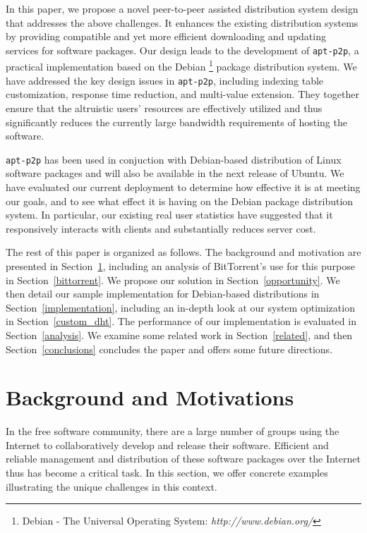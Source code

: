 \documentclass[conference]{IEEEtran}
\begin{document}
In this paper, we propose a novel peer-to-peer assisted distribution system design that
addresses the above challenges. It enhances the existing distribution systems by providing compatible and yet more efficient downloading and updating services
for software packages. Our design leads to the development of \texttt{apt-p2p}, a practical implementation based on the Debian \footnote{Debian - The Universal Operating System: {\it http://www.debian.org/}} package
distribution system.  We have addressed the key design issues in \texttt{apt-p2p}, including indexing table customization,
response time reduction, and multi-value extension. They together ensure
that the altruistic users' resources are effectively utilized and thus significantly reduces the currently
large bandwidth requirements of hosting the software.

\texttt{apt-p2p}  has been used in conjuction with Debian-based distribution of Linux
software packages and will also be available in the next release of Ubuntu. We have evaluated our current deployment  to
determine how effective it is at meeting our goals, and to see what
effect it is having on the Debian package distribution system. In particular, our existing real user statistics
have suggested that it responsively interacts with clients and substantially reduces server cost.

The rest of this paper is organized as follows. The background and motivation are presented in Section~\ref{situation}, including an analysis of BitTorrent's use for this purpose in Section~\ref{bittorrent}. We propose
our solution in Section~\ref{opportunity}. We then detail our sample
implementation for Debian-based distributions in Section~\ref{implementation},
including an in-depth look at our system optimization
in Section~\ref{custom_dht}. The performance of our implementation is evaluated
in Section~\ref{analysis}. We examine some related work in Section~\ref{related}, and then
Section~\ref{conclusions} concludes the paper and offers some future directions.


\section{Background and Motivations}
\label{situation}

In the free software community, there are a large number of groups using the Internet to
collaboratively develop and release their software. Efficient and reliable management and distribution 
of these software packages over the Internet thus has become a critical task. In this section, we offer concrete examples illustrating the
unique challenges in this context.
\end{document}

